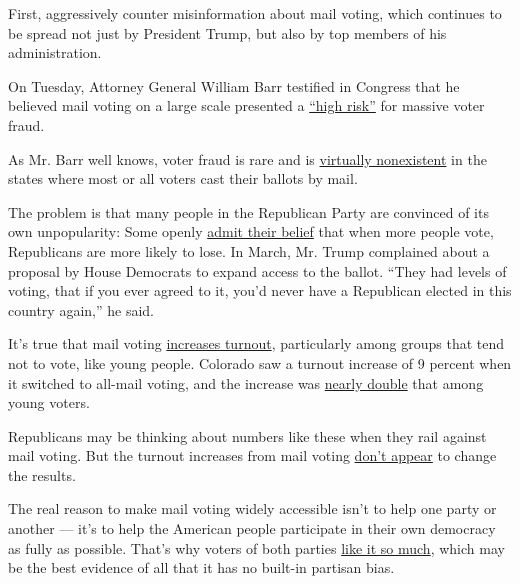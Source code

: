 First, aggressively counter misinformation about mail voting, which
continues to be spread not just by President Trump, but also by top
members of his administration.

On Tuesday, Attorney General William Barr testified in Congress that he
believed mail voting on a large scale presented a
\href{https://www.washingtonpost.com/video/politics/barr-states-that-mail-in-voting-could-lead-to-a-high-risk-of-fraud/2020/07/28/2db47f91-2c5f-41e3-904e-79072b68547d_video.html}{``high
risk''} for massive voter fraud.

As Mr. Barr well knows, voter fraud is rare and is
\href{https://docs.wixstatic.com/ugd/ef45f5_81a3affd554e4b5b9b5852f8fb3c10fd.pdf}{virtually
nonexistent} in the states where most or all voters cast their ballots
by mail.

The problem is that many people in the Republican Party are convinced of
its own unpopularity: Some openly
\href{https://www.washingtonpost.com/politics/2020/03/30/trump-voting-republicans/}{admit
their belief} that when more people vote, Republicans are more likely to
lose. In March, Mr. Trump complained about a proposal by House Democrats
to expand access to the ballot. ``They had levels of voting, that if you
ever agreed to it, you'd never have a Republican elected in this country
again,'' he said.

It's true that mail voting
\href{https://www.vox.com/policy-and-politics/2018/5/23/17383400/vote-by-mail-home-california-alaska-nebraska}{increases
turnout}, particularly among groups that tend not to vote, like young
people. Colorado saw a turnout increase of 9 percent when it switched to
all-mail voting, and the increase was
\href{https://www.nytimes3xbfgragh.onion/2020/05/04/opinion/coronavirus-vote-by-mail.html}{nearly
double} that among young voters.

Republicans may be thinking about numbers like these when they rail
against mail voting. But the turnout increases from mail voting
\href{https://www.nytimes3xbfgragh.onion/2020/04/10/us/politics/vote-by-mail.html}{don't
appear} to change the results.

The real reason to make mail voting widely accessible isn't to help one
party or another --- it's to help the American people participate in
their own democracy as fully as possible. That's why voters of both
parties
\href{https://news.gallup.com/poll/310586/americans-favor-voting-mail-option-november.aspx}{like
it so much}, which may be the best evidence of all that it has no
built-in partisan bias.

